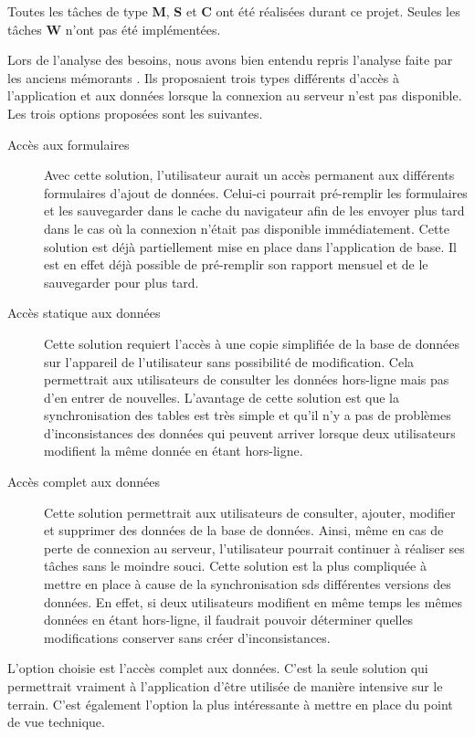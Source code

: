 \documentclass{EPL-master-thesis-covers-FR}
\begin{document}
			
			Toutes les tâches de type \textbf{M}, \textbf{S} et \textbf{C} ont été réalisées durant ce projet. Seules les tâches \textbf{W} n'ont pas été implémentées.
			
			Lors de l'analyse des besoins, nous avons bien entendu repris l'analyse faite par les anciens mémorants \cite{ref:haitiwater}. Ils proposaient trois types différents d'accès à l'application et aux données lorsque la connexion au serveur n'est pas disponible. Les trois options proposées sont les suivantes. 
			
			\begin{description}
				\item[Accès aux formulaires] Avec cette solution, l'utilisateur aurait un accès permanent aux différents formulaires d'ajout de données. Celui-ci pourrait pré-remplir les formulaires et les sauvegarder dans le cache du navigateur afin de les envoyer plus tard dans le cas où la connexion n'était pas disponible immédiatement. Cette solution est déjà partiellement mise en place dans l'application de base. Il est en effet déjà possible de pré-remplir son rapport mensuel et de le sauvegarder pour plus tard.
				\item[Accès statique aux données] Cette solution requiert l'accès à une copie simplifiée de la base de données sur l'appareil de l'utilisateur sans possibilité de modification. Cela permettrait aux utilisateurs de consulter les données hors-ligne mais pas d'en entrer de nouvelles. L'avantage de cette solution est que la synchronisation des tables est très simple et qu'il n'y a pas de problèmes d'inconsistances des données qui peuvent arriver lorsque deux utilisateurs modifient la même donnée en étant hors-ligne.
				\item[Accès complet aux données] Cette solution permettrait aux utilisateurs de consulter, ajouter, modifier et supprimer des données de la base de données. Ainsi, même en cas de perte de connexion au serveur, l'utilisateur pourrait continuer à réaliser ses tâches sans le moindre souci. Cette solution est la plus compliquée à mettre en place à cause de la synchronisation sds différentes versions des données. En effet, si deux utilisateurs modifient en même temps les mêmes données en étant hors-ligne, il faudrait pouvoir déterminer quelles modifications conserver sans créer d'inconsistances.  
			\end{description}
			
			L'option choisie est l'accès complet aux données. C'est la seule solution qui permettrait vraiment à l'application d'être utilisée de manière intensive sur le terrain. C'est également l'option la plus intéressante à mettre en place du point de vue technique.
			
\end{document}
